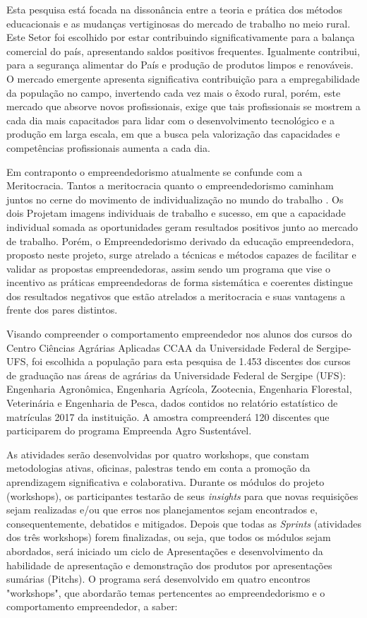 Esta pesquisa está focada na dissonância entre a teoria e prática dos métodos educacionais e as mudanças vertiginosas do mercado de trabalho no meio rural. Este Setor foi escolhido por estar contribuindo significativamente para a balança comercial do país, apresentando saldos positivos frequentes. Igualmente contribui, para a segurança alimentar do País e produção de produtos limpos e renováveis. O mercado emergente apresenta significativa contribuição para a empregabilidade da população no campo, invertendo cada vez mais o êxodo rural, porém, este mercado que absorve novos profissionais, exige que tais profissionais se mostrem a cada dia mais capacitados para lidar com o desenvolvimento tecnológico e a produção em larga escala, em que a busca pela valorização das capacidades e competências profissionais aumenta a cada dia. 

Em contraponto o empreendedorismo atualmente se confunde com a Meritocracia. Tantos a meritocracia quanto o empreendedorismo caminham juntos no cerne do movimento de individualização no mundo do trabalho \cite{costa_novo_2019}. Os dois  Projetam imagens individuais de trabalho e sucesso, em que a capacidade individual somada as oportunidades geram resultados positivos junto ao mercado de trabalho. Porém, o Empreendedorismo derivado da educação empreendedora, proposto neste projeto, surge atrelado a técnicas e métodos capazes de facilitar e validar as propostas empreendedoras, assim sendo um programa que vise o incentivo as práticas empreendedoras de forma sistemática e coerentes distingue dos resultados negativos que estão atrelados a meritocracia e suas vantagens a frente dos pares distintos.

Visando compreender o comportamento empreendedor nos alunos dos cursos do Centro Ciências Agrárias Aplicadas CCAA da Universidade Federal de Sergipe-UFS, foi escolhida a população para esta pesquisa de 1.453 discentes dos cursos de graduação nas áreas de agrárias da Universidade Federal de Sergipe (UFS): Engenharia Agronômica, Engenharia Agrícola, Zootecnia, Engenharia Florestal, Veterinária e Engenharia de Pesca, dados contidos no relatório estatístico de matrículas 2017 da instituição. A amostra compreenderá  120 discentes que participarem do programa Empreenda Agro Sustentável.

As atividades serão desenvolvidas por quatro workshops, que constam metodologias ativas, oficinas, palestras tendo em conta a promoção da aprendizagem significativa e colaborativa. Durante os módulos do projeto (workshops), os participantes testarão de seus \textit{insights} para que novas requisições sejam realizadas e/ou que erros nos planejamentos sejam encontrados e, consequentemente, debatidos e mitigados. Depois que todas as \textit{Sprints} (atividades dos três workshops) forem finalizadas, ou seja, que todos os módulos sejam abordados, será iniciado um ciclo de Apresentações e desenvolvimento da habilidade de apresentação e demonstração dos produtos por apresentações sumárias (Pitchs). O programa será desenvolvido em quatro encontros "workshops", que abordarão temas pertencentes ao empreendedorismo e o comportamento empreendedor, a saber: 

